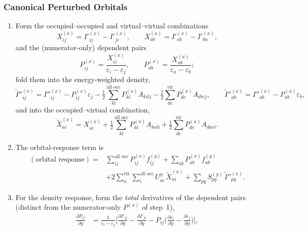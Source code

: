 \documentclass[12pt]{article}
\newcommand{\vir}{\text{vir}}
\newcommand{\alloc}{\text{all occ}}   %
\begin{document}
\subsubsection{Canonical Perturbed Orbitals}
\begin{enumerate}
\item Form the occupied--occupied and virtual--virtual combinations
\begin{equation*}
X^{(x)}_{ij}=I'^{(x)}_{ij}-I'^{(x)}_{ji},
\qquad
X^{(x)}_{ab}=I'^{(x)}_{ab}-I'^{(x)}_{ba},
\end{equation*}
and the (numerator-only) dependent pairs
\begin{equation*}
P^{(x)}_{ij}=\frac{X^{(x)}_{ij}}{\varepsilon_i-\varepsilon_j},
\qquad
P^{(x)}_{ab}=\frac{X^{(x)}_{ab}}{\varepsilon_a-\varepsilon_b};
\end{equation*}
fold them into the energy-weighted density,
\begin{equation*}
\tilde I''^{(x)}_{ij} = I''^{(x)}_{ij} - P^{(x)}_{ij}\varepsilon_j
- \tfrac12\sum_{kl}^{\alloc}P^{(x)}_{kl}A_{kilj}
- \tfrac12\sum_{de}^{\vir}P^{(x)}_{de}A_{diej},
\qquad
\tilde I''^{(x)}_{ab} = I''^{(x)}_{ab} - P^{(x)}_{ab}\varepsilon_b,
\end{equation*}
and into the occupied--virtual combination,
\begin{equation*}
\tilde X^{(x)}_{ai} = X^{(x)}_{ai}
+ \tfrac12\sum_{kl}^{\alloc}P^{(x)}_{kl}A_{kali}
+ \tfrac12\sum_{de}^{\vir}P^{(x)}_{de}A_{daei}.
\end{equation*}
\item The orbital-response term is
\begin{equation*}
\begin{split}
(\text{orbital response}) = {}&
\sum_{ij}^{\alloc}P^{(x)}_{ij}f^{(y)}_{ij}
+ \sum_{ab}P^{(x)}_{ab}f^{(y)}_{ab} \\
&+ 2\sum_{a}^{\vir}\sum_{i}^{\alloc}U^y_{ai}\,\tilde X^{(x)}_{ai}
+ \sum_{pq}S^{(y)}_{pq}\,\tilde I''^{(x)}_{pq}.
\end{split}
\end{equation*}
\item For the density response, form the {\em total} derivatives of the dependent
pairs (distinct from the numerator-only $P^{(x)}$ of step~1),
\begin{align*}
\frac{\partial P_{ij}}{\partial y}&=\frac{1}{\varepsilon_i-\varepsilon_j}\Big[
\frac{\partial I'_{ij}}{\partial y}-\frac{\partial I'_{ji}}{\partial y}
- P_{ij}\Big(\frac{\partial\varepsilon_i}{\partial y}-\frac{\partial\varepsilon_j}{\partial y}\Big)\Big],\\

\end{align*}
\end{enumerate}
\end{document}
